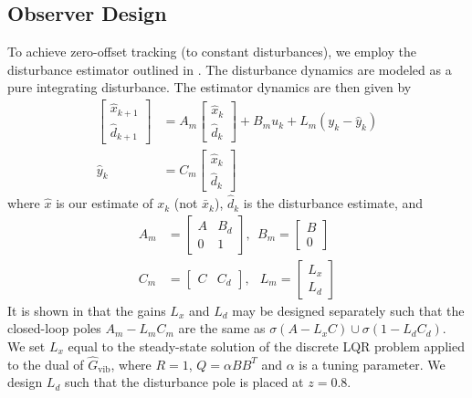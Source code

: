 \documentclass[twocolumn,twoside]{IEEEtran}
\newcommand{\x}{\ensuremath{x }\xspace}
\newcommand{\hGv}{\ensuremath{\hat{G}_{\text{vib}}}\xspace}
\begin{document}
\subsection{Observer Design}\label{sec:dist_est}
To achieve zero-offset tracking (to constant disturbances), we employ the disturbance estimator outlined in \cite{maeder_offset-free_2007}. The disturbance dynamics are modeled as a pure integrating disturbance. The estimator dynamics are then given by
\begin{align}
  \begin{bmatrix} \hat{\x}_{k+1}\\ \hat{d}_{k+1} \end{bmatrix}
  &= A_m
  \begin{bmatrix} \hat{\x}_{k}\\ \hat{d}_k\end{bmatrix}
    + B_m u_k + L_m(y_k - \hat y_k) \label{eqn:obsdyn}\\
  \hat y_k &= C_m\begin{bmatrix} \hat{\x}_k\label{eqn:yhat}\\
    \hat{d}_k \end{bmatrix}
\end{align}
where $\hat{x}$ is our estimate of $x_k$ (not $\bar{x}_k$), $\hat{d}_k$ is the disturbance estimate, and 
\begin{align}
  A_m& = \begin{bmatrix}
    A & B_d \\ 0 & 1
  \end{bmatrix},\:\:
  B_m =
  \begin{bmatrix}
    B \\ 0
  \end{bmatrix} \nonumber\\
  C_m &= 
    \begin{bmatrix}
    C & C_d
  \end{bmatrix},\:\:\;
  L_m = \begin{bmatrix} L_x\\L_d \end{bmatrix} \label{eqn:CmLm}
\end{align}
It is shown in \cite{maeder_offset-free_2007} that the gains $L_x$ and $L_d$ may be designed separately such that the closed-loop poles $A_m - L_mC_m$ are the same as $\sigma(A-L_xC)\cup \sigma(1-L_dC_d)$.
We set $L_x$ equal to the steady-state solution of the discrete LQR problem applied to the dual of $\hGv$, where $R=1$, $Q = \alpha BB^T$ and $\alpha$ is a tuning parameter. We design $L_d$ such that the disturbance pole is placed at $z=0.8$.
\end{document}
